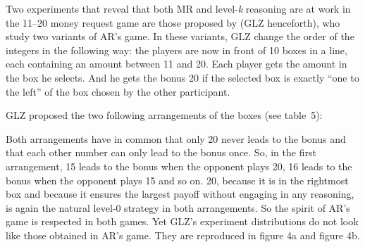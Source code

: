 \begin{Article}
\begin{refsection}[Umbhauer]
Two experiments that reveal that both MR and level-\emph{k} reasoning are at
work in the 11--20 money request game are those proposed by \textcite{goeree2018} (GLZ henceforth), who study two variants of AR's game. In these variants, GLZ change the order of the integers in the following way: the players are now in front of 10 boxes in a line, each containing an amount between 11 and 20. Each player gets the amount in the box he selects. And he gets the bonus 20 if the selected box is exactly ``one
to the left'' of the box chosen by the other participant.

GLZ proposed the two following arrangements of the boxes (see table~5):

\begin{table}[h!]
\caption{The two arrangements proposed by \textcite{goeree2018}}
\label{tab5}
\centering
{}
\end{table}


Both arrangements have in common that only 20 never leads to the bonus
and that each other number can only lead to the bonus once. So, in the
first arrangement, 15 leads to the bonus when the opponent plays 20, 16
leads to the bonus when the opponent plays 15 and so on. 20, because it
is in the rightmost box and because it ensures the largest payoff
without engaging in any reasoning, is again the natural level-0 strategy
in both arrangements. So the spirit of AR's game is respected in both
games. Yet GLZ's experiment distributions do not look like those
obtained in AR's game. They are reproduced in figure 4a and figure 4b.


\end{refsection}
\end{Article}
